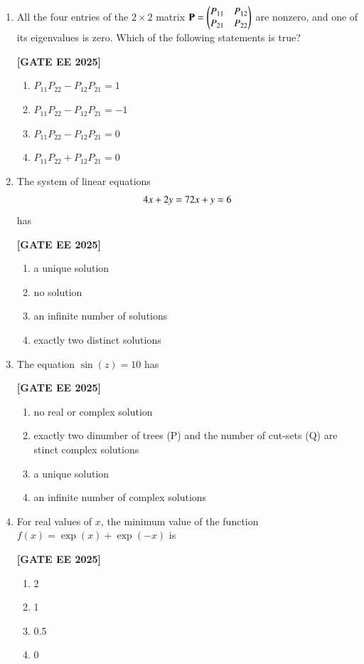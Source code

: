\documentclass[12pt]{article}
\begin{document}
\begin{enumerate}[leftmargin=2.5em, label=\textbf{Q.\arabic*}., itemsep=2em]
\item All the four entries of the $2\times2$ matrix $\mathbf{P} = \begin{pmatrix}P_{11} & P_{12}\\ P_{21} & P_{22}\end{pmatrix}$ are nonzero, and one of its eigenvalues is zero. Which of the following statements is true?
 
\noindent \textbf{[GATE EE 2025]}
    \begin{enumerate}
        \item $P_{11}P_{22} - P_{12}P_{21} = 1$
        \item $P_{11}P_{22} - P_{12}P_{21} = -1$
        \item $P_{11}P_{22} - P_{12}P_{21} = 0$
        \item $P_{11}P_{22} + P_{12}P_{21} = 0$
    \end{enumerate}

\item The system of linear equations
\[
4x + 2y = 7 \\
2x + y = 6
\]
has
 
\noindent \textbf{[GATE EE 2025]}
    \begin{enumerate}
        \item a unique solution
        \item no solution
        \item an infinite number of solutions
        \item exactly two distinct solutions
    \end{enumerate}

\item The equation $\sin(z) = 10$ has
 
\noindent \textbf{[GATE EE 2025]}
    \begin{enumerate}
        \item no real or complex solution
        \item exactly two dinumber of trees (P) and the number of cut-sets (Q) are
stinct complex solutions
        \item a unique solution
        \item an infinite number of complex solutions
    \end{enumerate}

\item For real values of $x$, the minimum value of the function $f(x) = \exp(x) + \exp(-x)$ is
 
\noindent \textbf{[GATE EE 2025]}
    \begin{enumerate}
        \item 2
        \item 1
        \item 0.5
        \item 0
    \end{enumerate}


\end{enumerate}
\end{document}

